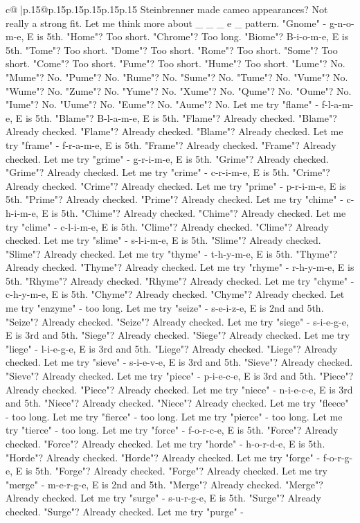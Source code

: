 \documentclass{article}
\begin{document}
{\begin{supertabular}{c@{$\;$}|p{.15\linewidth}@{}p{.15\linewidth}p{.15\linewidth}p{.15\linewidth}p{.15\linewidth}p{.15\linewidth}}
{{{Steinbrenner made cameo appearances? Not really a strong fit. Let me think more about \_ \_ \_ e \_ pattern. "Gnome" {-} g{-}n{-}o{-}m{-}e, E is 5th. "Home"? Too short. "Chrome"? Too long. "Biome"? B{-}i{-}o{-}m{-}e, E is 5th. "Tome"? Too short. "Dome"? Too short. "Rome"? Too short. "Some"? Too short. "Come"? Too short. "Fume"? Too short. "Hume"? Too short. "Lume"? No. "Mume"? No. "Pume"? No. "Rume"? No. "Sume"? No. "Tume"? No. "Vume"? No. "Wume"? No. "Zume"? No. "Yume"? No. "Xume"? No. "Qume"? No. "Oume"? No. "Iume"? No. "Uume"? No. "Eume"? No. "Aume"? No. Let me try "flame" {-} f{-}l{-}a{-}m{-}e, E is 5th. "Blame"? B{-}l{-}a{-}m{-}e, E is 5th. "Flame"? Already checked. "Blame"? Already checked. "Flame"? Already checked. "Blame"? Already checked. Let me try "frame" {-} f{-}r{-}a{-}m{-}e, E is 5th. "Frame"? Already checked. "Frame"? Already checked. Let me try "grime" {-} g{-}r{-}i{-}m{-}e, E is 5th. "Grime"? Already checked. "Grime"? Already checked. Let me try "crime" {-} c{-}r{-}i{-}m{-}e, E is 5th. "Crime"? Already checked. "Crime"? Already checked. Let me try "prime" {-} p{-}r{-}i{-}m{-}e, E is 5th. "Prime"? Already checked. "Prime"? Already checked. Let me try "chime" {-} c{-}h{-}i{-}m{-}e, E is 5th. "Chime"? Already checked. "Chime"? Already checked. Let me try "clime" {-} c{-}l{-}i{-}m{-}e, E is 5th. "Clime"? Already checked. "Clime"? Already checked. Let me try "slime" {-} s{-}l{-}i{-}m{-}e, E is 5th. "Slime"? Already checked. "Slime"? Already checked. Let me try "thyme" {-} t{-}h{-}y{-}m{-}e, E is 5th. "Thyme"? Already checked. "Thyme"? Already checked. Let me try "rhyme" {-} r{-}h{-}y{-}m{-}e, E is 5th. "Rhyme"? Already checked. "Rhyme"? Already checked. Let me try "chyme" {-} c{-}h{-}y{-}m{-}e, E is 5th. "Chyme"? Already checked. "Chyme"? Already checked. Let me try "enzyme" {-} too long. Let me try "seize" {-} s{-}e{-}i{-}z{-}e, E is 2nd and 5th. "Seize"? Already checked. "Seize"? Already checked. Let me try "siege" {-} s{-}i{-}e{-}g{-}e, E is 3rd and 5th. "Siege"? Already checked. "Siege"? Already checked. Let me try "liege" {-} l{-}i{-}e{-}g{-}e, E is 3rd and 5th. "Liege"? Already checked. "Liege"? Already checked. Let me try "sieve" {-} s{-}i{-}e{-}v{-}e, E is 3rd and 5th. "Sieve"? Already checked. "Sieve"? Already checked. Let me try "piece" {-} p{-}i{-}e{-}c{-}e, E is 3rd and 5th. "Piece"? Already checked. "Piece"? Already checked. Let me try "niece" {-} n{-}i{-}e{-}c{-}e, E is 3rd and 5th. "Niece"? Already checked. "Niece"? Already checked. Let me try "fleece" {-} too long. Let me try "fierce" {-} too long. Let me try "pierce" {-} too long. Let me try "tierce" {-} too long. Let me try "force" {-} f{-}o{-}r{-}c{-}e, E is 5th. "Force"? Already checked. "Force"? Already checked. Let me try "horde" {-} h{-}o{-}r{-}d{-}e, E is 5th. "Horde"? Already checked. "Horde"? Already checked. Let me try "forge" {-} f{-}o{-}r{-}g{-}e, E is 5th. "Forge"? Already checked. "Forge"? Already checked. Let me try "merge" {-} m{-}e{-}r{-}g{-}e, E is 2nd and 5th. "Merge"? Already checked. "Merge"? Already checked. Let me try "surge" {-} s{-}u{-}r{-}g{-}e, E is 5th. "Surge"? Already checked. "Surge"? Already checked. Let me try "purge" {-} }}}
\end{supertabular}}
\end{document}
